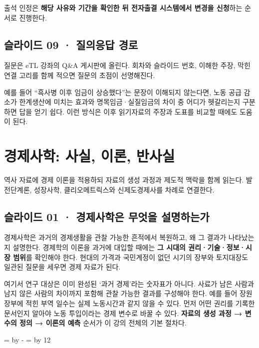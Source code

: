 \documentclass[10pt,a4paper]{article}
\newcommand{\ReserveQuestionSpace}{%
  \par\begingroup
  \dimen0=\pagegoal \advance\dimen0 by -\pagetotal
  \dimen2=\baselineskip \multiply\dimen2 by 12
  \ifdim\dimen0<\dimen2 \newpage\fi
  \endgroup}
\begin{document}
출석 인정은 \textbf{해당 사유와 기간을 확인한 뒤 전자출결 시스템에서 변경을 신청}하는 순서로 진행한다.\par

\subsection{슬라이드 09 · 질의응답 경로}
질문은 eTL 강좌의 Q\&A 게시판에 올린다. 회차와 슬라이드 번호, 이해한 주장, 막힌 연결 고리를 함께 적으면 질문의 초점이 선명해진다.\par

예를 들어 “흑사병 이후 임금이 상승했다”는 문장이 이해되지 않는다면, 노동 공급 감소가 한계생산에 미치는 효과와 명목임금·실질임금의 차이 중 어디가 헷갈리는지 구분하면 답을 얻기 쉽다. 이런 방식은 이후 읽기자료의 주장과 도표를 비교할 때에도 도움이 된다.\par

\section{경제사학: 사실, 이론, 반사실}
역사 자료에 경제 이론을 적용하되 자료의 생성 과정과 제도적 맥락을 함께 읽는다. 발전단계론, 성장사학, 클리오메트릭스와 신제도경제사를 차례로 연결한다.\par

\subsection{슬라이드 01 · 경제사학은 무엇을 설명하는가}
경제사학은 과거의 경제생활을 관찰 가능한 흔적에서 복원하고, 왜 그 결과가 나타났는지 설명한다. 경제학의 이론을 과거에 대입할 때에는 \textbf{그 시대의 권리·기술·정보·시장 범위}를 확인해야 한다. 현대의 가격과 국민계정이 없던 시기의 장부와 토지대장도 일관된 질문을 세우면 경제 자료가 된다.\par

여기서 연구 대상은 이미 완성된 ‘과거 경제’라는 숫자표가 아니다. 사료가 남은 사람과 남지 않은 사람의 차이까지 포함해 관찰 가능한 결과를 구성해야 한다. 예를 들어 장원 장부에 적힌 부역 일수는 실제 노동시간과 같지 않을 수 있다. 먼저 어떤 권리를 기록한 문서인지 알아야 노동 투입이라는 경제 변수로 바꿀 수 있다. \textbf{자료의 생성 과정 → 변수의 정의 → 이론의 예측} 순서가 이 강의 전체의 기본 절차다.\par

\ReserveQuestionSpace
\end{document}

